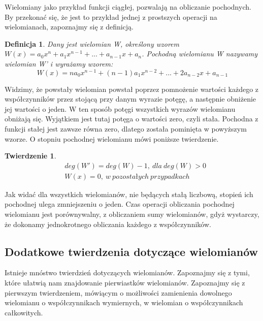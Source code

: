 \documentclass[twoside,a4paper]{book}
\newtheorem{theorem}{Twierdzenie}
\newtheorem{definition}{Definicja}
\begin{document}
Wielomiany jako przykład funkcji ciągłej, pozwalają na obliczanie pochodnych. By przekonać się, że jest to przykład jednej z prostszych operacji na wielomianach, zapoznajmy się z definicją.

\begin{definition}
	Dany jest wielomian W, określony wzorem $W(x) = a_0x^n + a_1x^{n-1} + ... + a_{n-1}x + a_n$. Pochodną wielomianu W nazywamy wielomian W' i wyrażamy wzorem:
	\begin{equation}
	W(x) = na_0x^{n-1} + (n-1)a_1x^{n-2} + ... + 2a_{n-2}x + a_{n-1}
	\end{equation}
\end{definition}

Widzimy, że powstały wielomian powstał poprzez pomnożenie wartości każdego z współczynników przez stojącą przy danym wyrazie potęgę, a następnie obniżenie jej wartości o jeden. W ten sposób potęgi wszystkich wyrazów wielomianu obniżają się. Wyjątkiem jest tutaj potęga o wartości zero, czyli stała. Pochodna z funkcji stałej jest zawsze równa zero, dlatego została pominięta w powyższym wzorze. O stopniu pochodnej wielomianu mówi poniższe twierdzenie.

\begin{theorem}
	\begin{equation}
	\begin{split}
		&deg(W') = deg(W) - 1,\ dla\ deg(W) > 0 \\
		&W(x) = 0,\ w\ pozostałych\ przypadkach
	\end{split}
	\end{equation}
\end{theorem}

Jak widać dla wszystkich wielomianów, nie będących stałą liczbową, stopień ich pochodnej ulega zmniejszeniu o jeden. Czas operacji obliczania pochodnej wielomianu jest porównywalny, z obliczaniem sumy wielomianów, gdyż wystarczy, że dokonamy jednokrotnego obliczania każdego z współczynników.


\subsection{Dodatkowe twierdzenia dotyczące wielomianów}

Istnieje mnóstwo twierdzień dotyczących wielomianów. Zapoznajmy się z tymi, które ułatwią nam znajdowanie pierwiastków wielomianów. Zapoznajmy się z pierwszym twierdzeniem, mówiącym o możliwości zamienienia dowolnego wielomianu o współczynnikach wymiernych, w wielomian o współczynnikach całkowitych.
\end{document}
